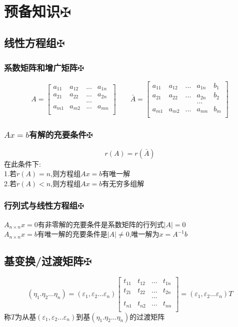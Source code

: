 \documentclass[11pt, a4paper, UTF8]{ctexart}
\begin{document}
\indent\\
\large
\raggedright
\def\fuck{\maltese}
\def\shit#1{#1\protect\hyperlink{catalog}{$\fuck$}}
\hypertarget{catalog}{}
\tableofcontents
\setcounter{secnumdepth}{-1}
\section{\shit{预备知识}}
\subsection{\shit{线性方程组}}
\subsubsection{\shit{系数矩阵和增广矩阵}}
\[
A=\begin{bmatrix}
a_{11}&a_{12}&...&a_{1n}\\
a_{21}&a_{22}&...&a_{2n}\\
&&...&\\
a_{m1}&a_{m2}&...&a_{mn}\\
\end{bmatrix}
\qquad\bar A=\begin{bmatrix}
a_{11}&a_{12}&...&a_{1n}&b_1\\
a_{21}&a_{22}&...&a_{2n}&b_2\\
&&&...&\\
a_{m1}&a_{m2}&...&a_{mn}&b_m\\
\end{bmatrix}\]
\subsubsection{\shit{$Ax=b$有解的充要条件}}
\[r(A)=r(\bar A)\]
在此条件下:\\
1.若$r(A)=n$,则方程组$Ax=b$有唯一解\\
2.若$r(A)<n$,则方程组$Ax=b$有无穷多组解
\subsubsection{\shit{行列式与线性方程组}}
$A_{n\times n}x=0$有非零解的充要条件是系数矩阵的行列式$|A|=0$\\
$A_{n\times n}x=b$有唯一解的充要条件是$|A|\not=0$,唯一解为$x=A^{-1}b$
\subsection{\shit{基变换/过渡矩阵}}
\[(\eta_1.\eta_2...\eta_n)=(\varepsilon_1,\varepsilon_2...\varepsilon_n)\begin{bmatrix}
t_{11}&t_{12}&...&t_{1n}\\
t_{21}&t_{22}&...&t_{2n}\\
&&...&\\
t_{n1}&t_{n2}&...&t_{nn}\\
\end{bmatrix}=(\varepsilon_1,\varepsilon_2...\varepsilon_n)T\]
称$T$为从基$(\varepsilon_1,\varepsilon_2...\varepsilon_n)$到基$(\eta_1.\eta_2...\eta_n)$的过渡矩阵\\
\end{document}
